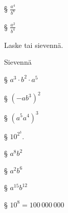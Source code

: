 \begin{tehtavasivu}
\begin{tehtava}
\begin{vastaus}
§ $\frac{a^4}{b^6}$ 
           
§ $\frac{a^2}{b^4}$
        \end{vastaus}
    \end{tehtava}

Laske tai sievennä.

    \begin{tehtava}%
        \begin{vastaus}
        \end{vastaus}
    \end{tehtava}    
    
         
    
    \begin{tehtava}%
        \begin{vastaus}
        \end{vastaus}
    \end{tehtava}     


\begin{tehtava}
        Sievennä 
       
§ $a^3\cdot b^2\cdot a^5$  
       
§ $(-ab^3)^2$  
       
§ $(a^5a^4)^3$  
       
§ $10^{2^3}$.

        \begin{vastaus}
           
§ $a^8b^2$ 
           
§ $a^2b^6$ 
           
§ $a^{15}b^{12}$ 
           
§ $10^8 = 100\,000\,000$
        \end{vastaus}
    \end{tehtava}



\end{tehtavasivu}
